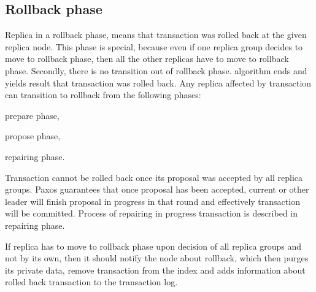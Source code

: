 


       

\subsection{Rollback phase}
Replica in a rollback phase, means that transaction was rolled back at the given replica node. 
This phase is special, because even if one replica group decides to move to rollback phase, then all the other replicas have to move to rollback phase. Secondly, there is no transition out of rollback phase. \mpt algorithm ends and yields result that transaction was rolled back.
Any replica affected by transaction can transition to rollback  from the following phases: \begin{enumerate*}
\item prepare phase,
\item propose phase,
\item repairing phase.
\end{enumerate*}

Transaction cannot be rolled back once its proposal was accepted by all replica groups. Paxos guarantees that once proposal has been accepted, current or other leader will finish proposal in progress in that round and effectively transaction will be committed. Process of repairing in progress transaction is described in repairing phase.

If replica has to move to rollback phase upon decision of all replica groups and not by its own, then it should notify the node about rollback, which then purges its private data, remove transaction from the index and adds information about rolled back transaction to the transaction log.


